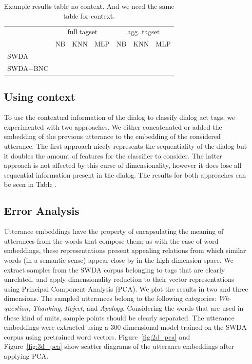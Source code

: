 \begin{table}[]
\centering
\small
\begin{tabular}{llll|lll}
                   & \multicolumn{3}{c|}{full tagset} & \multicolumn{3}{c}{agg. tagset} \\
                   & NB      & KNN     & MLP     & NB     & KNN     & MLP     \\
\hline
SWDA               &         &         &         &        &         &         \\
SWDA+BNC         &         &         &         &        &         &         \\
\end{tabular}
\caption{Example results table no context. And we need the same table for context.}
\label{tab:results}
\end{table}


\subsection{Using context}
To use the contextual information of the dialog to classify dialog act tags, we experimented with two  approaches. We either concatenated or added the embedding of the previous utterance to the embedding of the considered utterance.
The first approach nicely represents the sequentiality of the dialog but it doubles the amount of features for the classifier to consider.
The latter approach is not affected by this curse of dimensionality, however it does lose all sequential information present in the dialog.
The results for both approaches can be seen in Table . 

\subsection{Error Analysis}
Utterance embeddings have the property of encapsulating the meaning of utterances from the words that compose them; as with the case of word embeddings, these representations present appealing relations from which similar words (in a semantic sense) appear close by in the high dimension space.
We extract samples from the SWDA corpus belonging to tags that are clearly unrelated, and apply dimensionality reduction to their vector representations using Principal Component Analysis (PCA).
We plot the results in two and three dimensions.
The sampled utterances belong to the following categories: \emph{Wh-question}, \emph{Thanking}, \emph{Reject}, and \emph{Apology}.
Considering the words that are used in these kind of units, sample points should be clearly separated.
The utterance embeddings were extracted using a 300-dimensional model trained on the SWDA corpus using pretrained word vectors.
Figure~\ref{fig:2d_pca} and Figure~\ref{fig:3d_pca} show scatter diagrams of the utterance embeddings after applying PCA.

